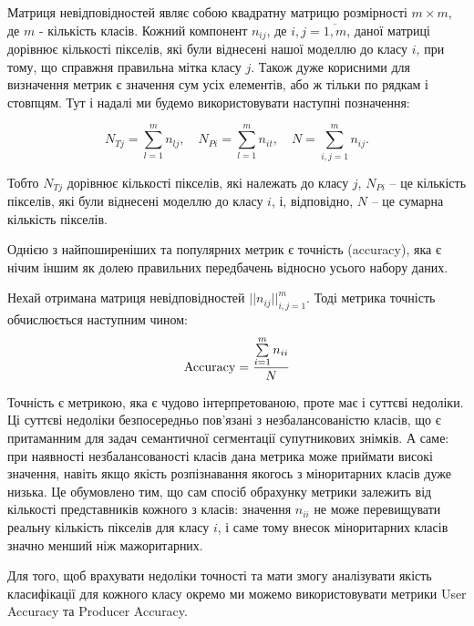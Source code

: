 Матриця невідповідностей являє собою квадратну
матрицю розмірності $m \times m$, де $m$ - кількість класів.
Кожний компонент $n_{ij}$, де $i,j=\overline{1, m}$, даної матриці
дорівнює кількості пікселів, які були віднесені нашої моделлю до
класу $i$, при тому, що справжня правильна мітка класу $j$.
Також дуже корисними для визначення метрик є значення сум
усіх елементів, або ж тільки по рядкам і стовпцям. Тут і надалі ми будемо
використовувати наступні позначення:

\begin{equation*}
    N_{Tj} = \sum\limits_{l=1}^{m} n_{lj}, \quad
    N_{Pi} = \sum\limits_{l=1}^{m} n_{it}, \quad
    N = \sum\limits_{i,j=1}^m n_{ij}.
\end{equation*}

Тобто $N_{Tj}$ дорівнює кількості пікселів, які належать до класу $j$,
$N_{Pi}$ -- це кількість пікселів, які були віднесені моделлю
до класу $i$, і, відповідно, $N$ -- це сумарна кількість пікселів.

Однією з найпоширеніших та популярних метрик є точність (accuracy),
яка є нічим іншим як долею правильних передбачень відносно усього набору даних.

\begin{definition}[Accuracy] \label{def:accuracy}
    Нехай отримана матриця невідповідностей $||n_{ij}||_{i,j=1}^m$.
    Тоді метрика точність обчислюється наступним чином:
    \begin{equation*}
        \operatorname{Accuracy} = \frac{\sum\limits_{i=1}^m n_{ii}}{N}
    \end{equation*}
\end{definition}

Точність є метрикою, яка є чудово інтерпретованою, проте має і
суттєві недоліки. Ці суттєві недоліки безпосередньо пов'язані
з незбалансованістю класів, що є притаманним для задач семантичної сегментації
супутникових знімків. А саме: при наявності незбалансованості
класів дана метрика може приймати високі значення, навіть якщо
якість розпізнавання якогось з міноритарних класів дуже низька. Це обумовлено тим,
що сам спосіб обрахунку метрики залежить від кількості представників
кожного з класів: значення $n_{ii}$ не може перевищувати реальну кількість
пікселів для класу $i$, і саме тому внесок міноритарних класів
значно менший ніж мажоритарних.

Для того, щоб врахувати недоліки точності та мати змогу
аналізувати якість класифікації для кожного класу окремо
ми можемо використовувати метрики User Accuracy та
Producer Accuracy.

